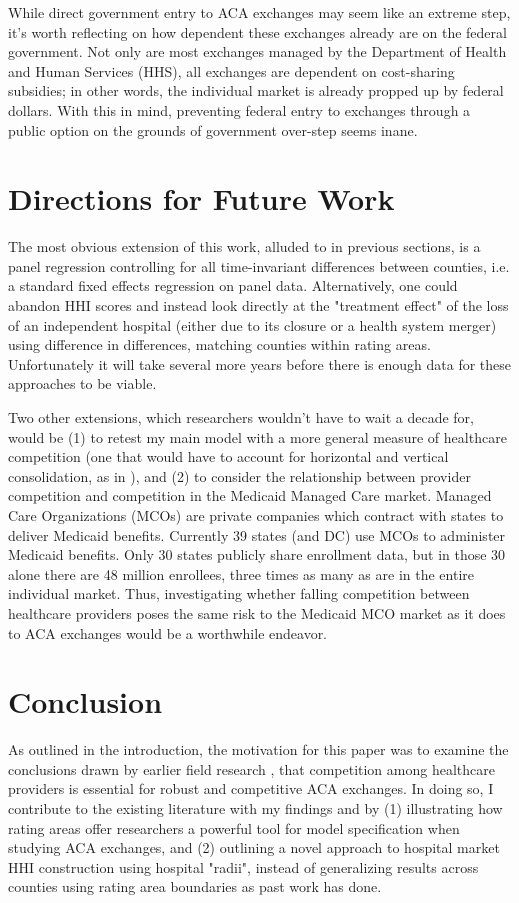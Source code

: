 \documentclass[12pt,letterpaper]{article}
\begin{document}
While direct government entry to ACA exchanges may seem like an extreme step, it's worth reflecting on how dependent these exchanges already are on the federal government. Not only are most exchanges managed by the Department of Health and Human Services (HHS), all exchanges are dependent on cost-sharing subsidies; in other words, the individual market is already propped up by federal dollars. With this in mind, preventing federal entry to exchanges through a public option on the grounds of government over-step seems inane. 

\section{Directions for Future Work}

The most obvious extension of this work, alluded to in previous sections, is a panel regression controlling for all time-invariant differences between counties, i.e. a standard fixed effects regression on panel data. Alternatively, one could abandon HHI scores and instead look directly at the "treatment effect" of the loss of an independent hospital (either due to its closure or a health system merger) using difference in differences, matching counties within rating areas.  Unfortunately it will take several more years before there is enough data for these approaches to be viable.  

Two other extensions, which researchers wouldn't have to wait a decade for, would be (1) to retest my main model with a more general measure of healthcare competition (one that would have to account for horizontal and vertical consolidation, as in \citet{scheffler_consolidation_2018}), and (2) to consider the relationship between provider competition and competition in the Medicaid Managed Care market. Managed Care Organizations (MCOs) are private companies which contract with states to deliver Medicaid benefits. Currently 39 states (and DC) use MCOs to administer Medicaid benefits. Only 30 states publicly share enrollment data, but in those 30 alone there are 48 million enrollees, three times as many as are in the entire individual market. Thus, investigating whether falling competition between healthcare providers poses the same risk to the Medicaid MCO market as it does to ACA exchanges would be a worthwhile endeavor. 

\section*{Conclusion}
As outlined in the introduction, the motivation for this paper was to examine the conclusions drawn by earlier field research \citep{morrisey_five-state_2017}, that competition among healthcare providers is essential for robust and competitive ACA exchanges. In doing so, I contribute to the existing literature with my findings and by (1) illustrating how rating areas offer researchers a powerful tool for model specification when studying ACA exchanges, and (2) outlining a novel approach to hospital market HHI construction using hospital "radii", instead of generalizing results across counties using rating area boundaries as past work has done. 
\end{document}

